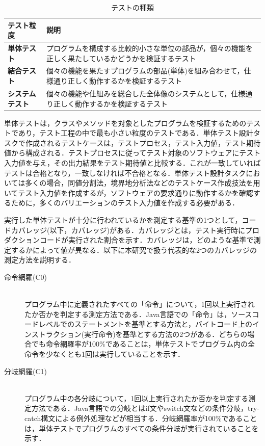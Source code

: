 \documentclass[12pt]{jarticle} %
\begin{document}
\begin{table}[t]
\caption{テストの種類}
\label{test-variety}
\begin{tabular}{|l|p{11cm}|}
\hline
\textbf{テスト粒度} & \textbf{説明} \\ \hline
\textbf{単体テスト} & プログラムを構成する比較的小さな単位の部品が，個々の機能を正しく果たしているかどうかを検証するテスト \\ \hline
\textbf{結合テスト} & 個々の機能を果たすプログラムの部品(単体)を組み合わせて，仕様通り正しく動作するかを検証するテスト\\ \hline
\textbf{システムテスト} & 個々の機能や仕組みを総合した全体像のシステムとして，仕様通り正しく動作するかを検証するテスト \\ \hline
\end{tabular}
\end{table}

単体テストは，クラスやメソッドを対象としたプログラムを検証するためのテストであり，テスト工程の中で最も小さい粒度のテストである．単体テスト設計タスクで作成されるテストケースは，テストプロセス，テスト入力値，テスト期待値から構成される．テストプロセスに従ってテスト対象のソフトウェアにテスト入力値を与え，その出力結果をテスト期待値と比較する．これが一致していればテストは合格となり，一致しなければ不合格となる．単体テスト設計タスクにおいては多くの場合，同値分割法，境界地分析法などのテストケース作成技法を用いてテスト入力値を作成するが，ソフトウェアの要求通りに動作するかを確認するために，多くのバリエーションのテスト入力値を作成する必要がある．

実行した単体テストが十分に行われているかを測定する基準の1つとして，コードカバレッジ(以下，カバレッジ)がある．カバレッジとは，テスト実行時にプロダクションコードが実行された割合を示す．カバレッジは，どのような基準で測定するかによって値が異なる．以下に本研究で扱う代表的な2つのカバレッジの測定方法を説明する．

\begin{description}
\item[命令網羅(C0)]~\\
プログラム中に定義されたすべての「命令」について，1回以上実行されたか否かを判定する測定方法である．Java言語での「命令」は，ソースコードレベルでのステートメントを基準とする方法と，バイトコード上のインストラクション(実行命令)を基準とする方法の2つがある．どちらの場合でも命令網羅率が100\%であることは，単体テストでプログラム内の全命令を少なくとも1回は実行していることを示す．
\item[分岐網羅(C1)]~\\
プログラム中の各分岐について，1回以上実行されたか否かを判定する測定方法である．Java言語での分岐とはif文やswitch文などの条件分岐，try-catch構文による例外処理などが相当する．分岐網羅率が100\%であることは，単体テストでプログラムのすべての条件分岐が実行されていることを示す．
\end{description}
\end{document}
